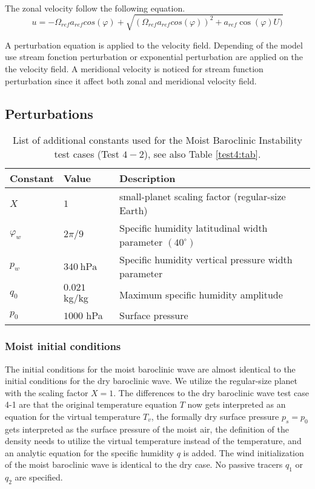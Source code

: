 \documentclass[times,doublespace]{fldauth}
\begin{document}
\clearpage


~\\ The zonal velocity follow the following equation.  
\begin{equation}
 u=-\Omega_{ref} a_{ref} cos(\varphi)+\sqrt{(\Omega_{ref} a_{ref} cos(\varphi))^2+ a_{ref} \cos(\varphi)U)}
\end{equation}

A perturbation equation is applied to the velocity field. Depending of the model use stream fonction perturbation or exponential perturbation are applied on the the velocity field. A meridional velocity is noticed for stream function perturbation since it affect both zonal and meridional velocity field.





 
\subsection{Perturbations}

\begin{table}[h]

\caption{List of additional constants used for the Moist Baroclinic Instability test cases (Test $4-2$), see also Table \ref{test4:tab}.}
\label{test42:tab}
\begin{tabular*}{\textwidth}{@{\extracolsep{\fill}}lll}
\hline Constant & Value & Description \\
\hline 
$X$ & $1$ & small-planet scaling factor (regular-size Earth)\\
$\varphi_w$ & $2 \pi / 9$ & Specific humidity latitudinal width parameter $(40^\circ)$\\
$p_w$ & $340\ \mbox{hPa}$ & Specific humidity vertical pressure width parameter \\
$q_0$ & $0.021$ kg/kg& Maximum specific humidity amplitude \\
$p_0$ & $1000$ hPa& Surface pressure \\
\hline 
\end{tabular*}

\end{table}

\subsubsection*{Moist initial conditions}
The initial conditions for the moist baroclinic wave are almost identical to the initial conditions for the dry baroclinic wave. We utilize the regular-size planet with the scaling factor $X=1$. The differences to the dry baroclinic wave test case 4-1 are that the original temperature equation $T$ now gets interpreted as an equation for the virtual temperature $T_v$, the formally dry surface pressure $p_s = p_0$ gets interpreted as the surface pressure of the moist air, the definition of the density needs to utilize the virtual temperature instead of the temperature, and an analytic equation for the specific humidity $q$ is added. The wind initialization of the moist baroclinic wave is identical to the dry case. No passive tracers $q_1$  or $q_2$ are specified.
\end{document}

